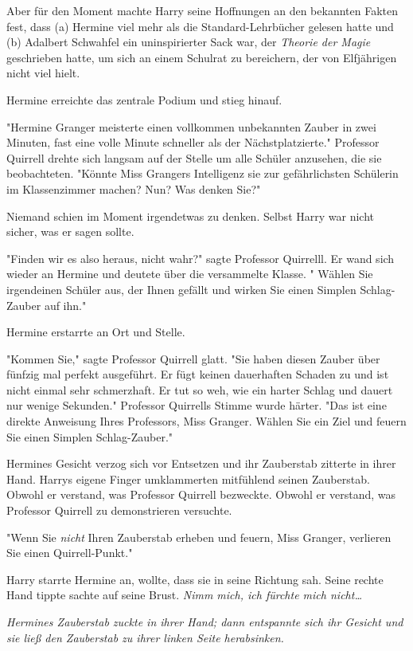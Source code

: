 {Aber für den Moment machte Harry seine Hoffnungen an den bekannten Fakten fest, dass (a) Hermine viel mehr als die Standard-Lehrbücher gelesen hatte und (b) Adalbert Schwahfel ein uninspirierter Sack war, der \emph{Theorie der Magie} geschrieben hatte, um sich an einem Schulrat zu bereichern, der von Elfjährigen nicht viel hielt.

Hermine erreichte das zentrale Podium und stieg hinauf.

"Hermine Granger meisterte einen vollkommen unbekannten Zauber in zwei Minuten, fast eine volle Minute schneller als der Nächstplatzierte." Professor Quirrell drehte sich langsam auf der Stelle um alle Schüler anzusehen, die sie beobachteten. "Könnte Miss Grangers Intelligenz sie zur gefährlichsten Schülerin im Klassenzimmer machen? Nun? Was denken Sie?"

Niemand schien im Moment irgendetwas zu denken. Selbst Harry war nicht sicher, was er sagen sollte.

"Finden wir es also heraus, nicht wahr?" sagte Professor Quirrelll. Er wand sich wieder an Hermine und deutete über die versammelte Klasse. " Wählen Sie irgendeinen Schüler aus, der Ihnen gefällt und wirken Sie einen Simplen Schlag-Zauber auf ihn."

Hermine erstarrte an Ort und Stelle.

"Kommen Sie," sagte Professor Quirrell glatt. "Sie haben diesen Zauber über fünfzig mal perfekt ausgeführt. Er fügt keinen dauerhaften Schaden zu und ist nicht einmal sehr schmerzhaft. Er tut so weh, wie ein harter Schlag und dauert nur wenige Sekunden." Professor Quirrells Stimme wurde härter. "Das ist eine direkte Anweisung Ihres Professors, Miss Granger. Wählen Sie ein Ziel und feuern Sie einen Simplen Schlag-Zauber."

Hermines Gesicht verzog sich vor Entsetzen und ihr Zauberstab zitterte in ihrer Hand. Harrys eigene Finger umklammerten mitfühlend seinen Zauberstab. Obwohl er verstand, was Professor Quirrell bezweckte. Obwohl er verstand, was Professor Quirrell zu demonstrieren versuchte.

"Wenn Sie \emph{nicht} Ihren Zauberstab erheben und feuern, Miss Granger, verlieren Sie einen Quirrell-Punkt."

Harry starrte Hermine an, wollte, dass sie in seine Richtung sah. Seine rechte Hand tippte sachte auf seine Brust. \emph{Nimm mich, ich fürchte mich nicht…}

\emph{Hermines Zauberstab zuckte in ihrer Hand; dann entspannte sich ihr Gesicht und sie ließ den Zauberstab zu ihrer linken Seite herabsinken.}

}

